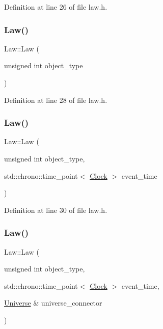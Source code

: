 Definition at line 26 of file law.\+h.

\mbox{\label{class_law_afd1730474b2806ec6665e16419f4994c}} 
\subsubsection{\texorpdfstring{Law()}{Law()}\hspace{0.1cm}{\footnotesize\ttfamily [2/4]}}
{\footnotesize\ttfamily Law\+::\+Law (\begin{DoxyParamCaption}\item[{unsigned int}]{object\+\_\+type }\end{DoxyParamCaption})\hspace{0.3cm}{\ttfamily [inline]}}



Definition at line 28 of file law.\+h.

\mbox{\label{class_law_afdc75daa3a3346c473454c7a4dc2eab5}} 
\subsubsection{\texorpdfstring{Law()}{Law()}\hspace{0.1cm}{\footnotesize\ttfamily [3/4]}}
{\footnotesize\ttfamily Law\+::\+Law (\begin{DoxyParamCaption}\item[{unsigned int}]{object\+\_\+type,  }\item[{std\+::chrono\+::time\+\_\+point$<$ \hyperlink{universe_8h_a0ef8d951d1ca5ab3cfaf7ab4c7a6fd80}{Clock} $>$}]{event\+\_\+time }\end{DoxyParamCaption})\hspace{0.3cm}{\ttfamily [inline]}}



Definition at line 30 of file law.\+h.

\mbox{\label{class_law_aa4fb7baf54aa77720605fd601fb80b8d}} 
\subsubsection{\texorpdfstring{Law()}{Law()}\hspace{0.1cm}{\footnotesize\ttfamily [4/4]}}
{\footnotesize\ttfamily Law\+::\+Law (\begin{DoxyParamCaption}\item[{unsigned int}]{object\+\_\+type,  }\item[{std\+::chrono\+::time\+\_\+point$<$ \hyperlink{universe_8h_a0ef8d951d1ca5ab3cfaf7ab4c7a6fd80}{Clock} $>$}]{event\+\_\+time,  }\item[{\hyperlink{class_universe}{Universe} \&}]{universe\+\_\+connector }\end{DoxyParamCaption})\hspace{0.3cm}{\ttfamily [inline]}}



